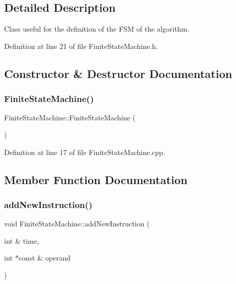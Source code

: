 \subsection{Detailed Description}
Class useful for the definition of the F\+SM of the algorithm. 

Definition at line 21 of file Finite\+State\+Machine.\+h.



\subsection{Constructor \& Destructor Documentation}
\mbox{\label{classoctantis_1_1FiniteStateMachine_a7f4b2e43939afa064ee2d8232ad9634e}} 
\subsubsection{\texorpdfstring{Finite\+State\+Machine()}{FiniteStateMachine()}}
{\footnotesize\ttfamily Finite\+State\+Machine\+::\+Finite\+State\+Machine (\begin{DoxyParamCaption}{ }\end{DoxyParamCaption})}



Definition at line 17 of file Finite\+State\+Machine.\+cpp.



\subsection{Member Function Documentation}
\mbox{\label{classoctantis_1_1FiniteStateMachine_a598e2f7c88a6ad25475edd96229eda21}} 
\subsubsection{\texorpdfstring{add\+New\+Instruction()}{addNewInstruction()}}
{\footnotesize\ttfamily void Finite\+State\+Machine\+::add\+New\+Instruction (\begin{DoxyParamCaption}\item[{int \&}]{time,  }\item[{int $\ast$const \&}]{operand }\end{DoxyParamCaption})}




